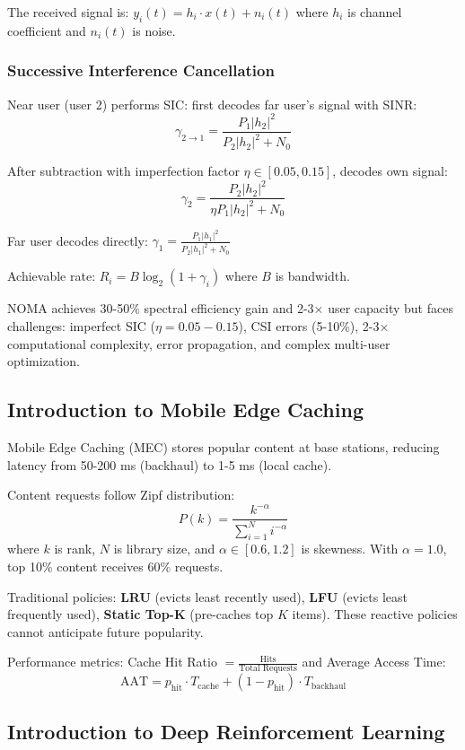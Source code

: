 \documentclass[12pt,a4paper]{article}
\begin{document}
The received signal is: $y_i(t) = h_i \cdot x(t) + n_i(t)$ where $h_i$ is channel coefficient and $n_i(t)$ is noise.

\subsubsection{Successive Interference Cancellation}

Near user (user 2) performs SIC: first decodes far user's signal with SINR:
\[
\gamma_{2 \rightarrow 1} = \frac{P_1 |h_2|^2}{P_2 |h_2|^2 + N_0}
\]

After subtraction with imperfection factor $\eta \in [0.05, 0.15]$, decodes own signal:
\[
\gamma_2 = \frac{P_2 |h_2|^2}{\eta P_1 |h_2|^2 + N_0}
\]

Far user decodes directly: $\gamma_1 = \frac{P_1 |h_1|^2}{P_2 |h_1|^2 + N_0}$

Achievable rate: $R_i = B \log_2(1 + \gamma_i)$ where $B$ is bandwidth.

NOMA achieves 30-50\% spectral efficiency gain and 2-3× user capacity but faces challenges: imperfect SIC ($\eta = 0.05-0.15$), CSI errors (5-10\%), 2-3× computational complexity, error propagation, and complex multi-user optimization.

\subsection{Introduction to Mobile Edge Caching}

Mobile Edge Caching (MEC) stores popular content at base stations, reducing latency from 50-200 ms (backhaul) to 1-5 ms (local cache).

Content requests follow Zipf distribution:
\[
P(k) = \frac{k^{-\alpha}}{\sum_{i=1}^{N} i^{-\alpha}}
\]
where $k$ is rank, $N$ is library size, and $\alpha \in [0.6, 1.2]$ is skewness. With $\alpha = 1.0$, top 10\% content receives 60\% requests.

Traditional policies: \textbf{LRU} (evicts least recently used), \textbf{LFU} (evicts least frequently used), \textbf{Static Top-K} (pre-caches top $K$ items). These reactive policies cannot anticipate future popularity.

Performance metrics: Cache Hit Ratio $= \frac{\text{Hits}}{\text{Total Requests}}$ and Average Access Time:
\[
\text{AAT} = p_{\text{hit}} \cdot T_{\text{cache}} + (1 - p_{\text{hit}}) \cdot T_{\text{backhaul}}
\]

\subsection{Introduction to Deep Reinforcement Learning}
\end{document}
